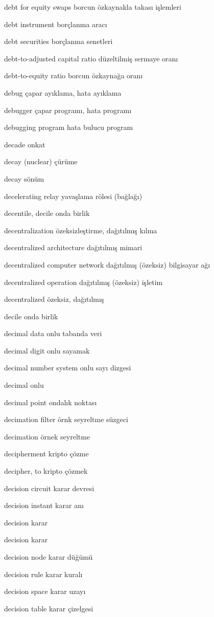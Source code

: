 \documentclass[12pt,fleqn]{article}\usepackage{../../common}
\begin{document}
debt for equity swaps borcun özkaynakla takası işlemleri

debt instrument borçlanma aracı

debt securities borçlanma senetleri

debt-to-adjusted capital ratio düzeltilmiş sermaye oranı

debt-to-equity ratio borcun özkaynağa oranı

debug çapar ayıklama, hata ayıklama

debugger çapar programı, hata programı

debugging program hata bulucu program

decade onkat

decay (nuclear) çürüme

decay sönüm

decelerating relay yavaşlama rölesi (bağlağı)

decentile, decile onda birlik

decentralization özeksizleştirme, dağıtılmış kılma

decentralized architecture dağıtılmış mimari

decentralized computer network dağıtılmış (özeksiz) bilgisayar ağı

decentralized operation dağıtılmış (özeksiz) işletim

decentralized özeksiz, dağıtılmış

decile onda birlik

decimal data onlu tabanda veri

decimal digit onlu sayamak

decimal number system onlu sayı dizgesi

decimal onlu

decimal point ondalık noktası

decimation filter örnk seyreltme süzgeci

decimation örnek seyreltme

decipherment kripto çözme

decipher, to kripto çözmek

decision circuit karar devresi

decision instant karar anı

decision karar

decision karar

decision node karar düğümü

decision rule karar kuralı

decision space karar uzayı

decision table karar çizelgesi
\end{document}
